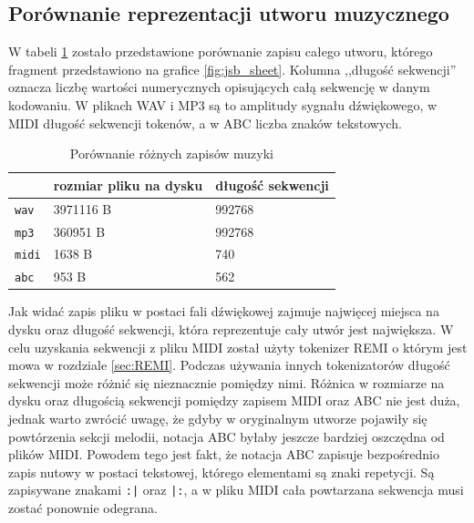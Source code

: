 \documentclass[data-science]{agh-wi} %
\begin{document}
\subsection{Porównanie reprezentacji utworu muzycznego}
W tabeli \ref*{tab:music_diff} zostało przedstawione porównanie zapisu całego utworu, którego fragment przedstawiono na grafice \ref*{fig:jsb_sheet}. Kolumna ,,długość sekwencji'' oznacza liczbę wartości numerycznych opisujących całą sekwencję w danym kodowaniu. W plikach WAV i MP3 są to amplitudy sygnału dźwiękowego, w MIDI długość sekwencji tokenów, a w ABC liczba znaków tekstowych.

\begin{table}[ht!]
    \centering
    \begin{tabular}{|l|l|l|}
        \hline
                      & rozmiar pliku na dysku & długość sekwencji \\ \hline
        \texttt{wav}  & 3971116 B              & 992768            \\ \hline
        \texttt{mp3}  & 360951 B               & 992768            \\ \hline
        \texttt{midi} & 1638 B                 & 740               \\ \hline
        \texttt{abc}  & 953 B                  & 562               \\ \hline
    \end{tabular}
    \caption{Porównanie różnych zapisów muzyki}\label{tab:music_diff}
\end{table}

Jak widać zapis pliku w postaci fali dźwiękowej zajmuje najwięcej miejsca na dysku oraz długość sekwencji, która reprezentuje cały utwór jest największa. W celu uzyskania sekwencji z pliku MIDI został użyty tokenizer REMI o którym jest mowa w rozdziale \ref*{sec:REMI}. Podczas używania innych tokenizatorów długość sekwencji może różnić się nieznacznie pomiędzy nimi. Różnica w rozmiarze na dysku oraz długością sekwencji pomiędzy zapisem MIDI oraz ABC nie jest duża, jednak warto zwrócić uwagę, że gdyby w oryginalnym utworze pojawiły się powtórzenia sekcji melodii, notacja ABC byłaby jeszcze bardziej oszczędna od plików MIDI. Powodem tego jest fakt, że notacja ABC zapisuje bezpośrednio zapis nutowy w postaci tekstowej, którego elementami są znaki repetycji. Są zapisywane znakami \texttt{:|} oraz \texttt{|:}, a w pliku MIDI cała powtarzana sekwencja musi zostać ponownie odegrana.
\end{document}
